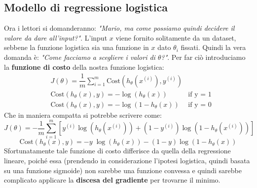 \subsection{Modello di regressione logistica}
Ora i lettori si domanderanno: \textit{"Mario, ma come possiamo quindi decidere il valore da dare all'input?"}. L'input $x$ viene fornito solitamente da un dataset, sebbene la funzione logistica sia una funzione in $x$ dato $\theta_i$ fissati. Quindi la vera domanda è:\textit{ "Come facciamo a scegliere i valori di $\theta$?"}. Per far ciò introduciamo la \textbf{funzione di costo} della nostra funzione logistica:
\begin{align*}& J(\theta) = \dfrac{1}{m} \sum_{i=1}^m \mathrm{Cost}(h_\theta(x^{(i)}),y^{(i)}) \\ & \mathrm{Cost}(h_\theta(x),y) = -\log(h_\theta(x)) \; & \text{if y = 1} \\ & \mathrm{Cost}(h_\theta(x),y) = -\log(1-h_\theta(x)) \; & \text{if y = 0}\end{align*}
Che in maniera compatta si potrebbe scrivere come:
\[J(\theta) = - \frac{1}{m} \displaystyle \sum_{i=1}^m [y^{(i)}\log (h_\theta (x^{(i)})) + (1 - y^{(i)})\log (1 - h_\theta(x^{(i)}))]\]
\[\mathrm{Cost}(h_\theta(x),y) = - y \; \log(h_\theta(x)) - (1 - y) \log(1 - h_\theta(x))\]
Sfortunatamente tale funzione di costo differisce da quella della regressione lineare, poiché essa (prendendo in considerazione l'ipotesi logistica, quindi basata su una funzione sigmoide) non sarebbe una funzione convessa e quindi sarebbe complicato applicare la \textbf{discesa del gradiente} per trovarne il minimo.\\
